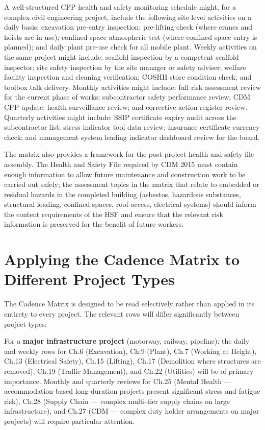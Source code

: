 A well-structured CPP health and safety monitoring schedule might, for a complex civil engineering project, include the following site-level activities on a daily basis: excavation pre-entry inspection; pre-lifting check (where cranes and hoists are in use); confined space atmospheric test (where confined space entry is planned); and daily plant pre-use check for all mobile plant. Weekly activities on the same project might include: scaffold inspection by a competent scaffold inspector; site safety inspection by the site manager or safety adviser; welfare facility inspection and cleaning verification; COSHH store condition check; and toolbox talk delivery. Monthly activities might include: full risk assessment review for the current phase of works; subcontractor safety performance review; CDM CPP update; health surveillance review; and corrective action register review. Quarterly activities might include: SSIP certificate expiry audit across the subcontractor list; stress indicator tool data review; insurance certificate currency check; and management system leading indicator dashboard review for the board.

The matrix also provides a framework for the post-project health and safety file assembly. The Health and Safety File required by CDM 2015 must contain enough information to allow future maintenance and construction work to be carried out safely; the assessment topics in the matrix that relate to embedded or residual hazards in the completed building (asbestos, hazardous substances, structural loading, confined spaces, roof access, electrical systems) should inform the content requirements of the HSF and ensure that the relevant risk information is preserved for the benefit of future workers.

\section*{Applying the Cadence Matrix to Different Project Types}

The Cadence Matrix is designed to be read selectively rather than applied in its entirety to every project. The relevant rows will differ significantly between project types:

For a \textbf{major infrastructure project} (motorway, railway, pipeline): the daily and weekly rows for Ch.6 (Excavation), Ch.9 (Plant), Ch.7 (Working at Height), Ch.13 (Electrical Safety), Ch.15 (Lifting), Ch.17 (Demolition where structures are removed), Ch.19 (Traffic Management), and Ch.22 (Utilities) will be of primary importance. Monthly and quarterly reviews for Ch.25 (Mental Health --- accommodation-based long-duration projects present significant stress and fatigue risk), Ch.28 (Supply Chain --- complex multi-tier supply chains on large infrastructure), and Ch.27 (CDM --- complex duty holder arrangements on major projects) will require particular attention.

